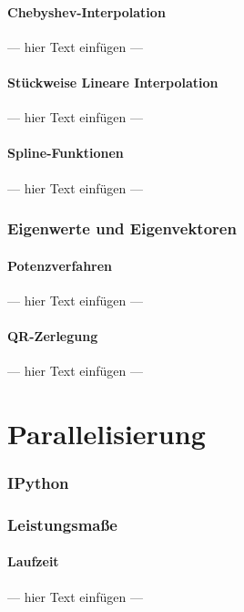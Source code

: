 \documentclass[a4paper, 12pt]{article}
\begin{document}
\subsection{Chebyshev-Interpolation}
--- hier Text einfügen ---


\subsection{Stückweise Lineare Interpolation}
--- hier Text einfügen ---


\subsection{Spline-Funktionen}
--- hier Text einfügen ---



\section{Eigenwerte und Eigenvektoren}


\subsection{Potenzverfahren}
--- hier Text einfügen ---


\subsection{QR-Zerlegung}
--- hier Text einfügen ---




\part{Parallelisierung}



\section{IPython}



\section{Leistungsmaße}


\subsection{Laufzeit}
--- hier Text einfügen ---
\end{document}
